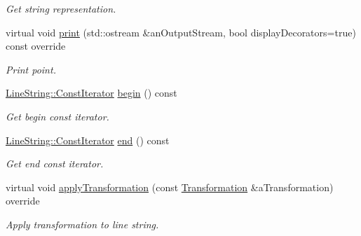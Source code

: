 \begin{DoxyCompactItemize}
\begin{DoxyCompactList}\small\item\em Get string representation. \end{DoxyCompactList}\item 
virtual void \hyperlink{classlibrary_1_1math_1_1geom_1_1d2_1_1objects_1_1_line_string_ae980ac86d1f2d8091151252aef2b6adc}{print} (std\+::ostream \&an\+Output\+Stream, bool display\+Decorators=true) const override
\begin{DoxyCompactList}\small\item\em Print point. \end{DoxyCompactList}\item 
\hyperlink{classlibrary_1_1math_1_1geom_1_1d2_1_1objects_1_1_line_string_a7c7a81b557da8ed855b5f4b88a5fa837}{Line\+String\+::\+Const\+Iterator} \hyperlink{classlibrary_1_1math_1_1geom_1_1d2_1_1objects_1_1_line_string_af2e6ff6ec6714eb64bda3c270c92469d}{begin} () const
\begin{DoxyCompactList}\small\item\em Get begin const iterator. \end{DoxyCompactList}\item 
\hyperlink{classlibrary_1_1math_1_1geom_1_1d2_1_1objects_1_1_line_string_a7c7a81b557da8ed855b5f4b88a5fa837}{Line\+String\+::\+Const\+Iterator} \hyperlink{classlibrary_1_1math_1_1geom_1_1d2_1_1objects_1_1_line_string_af86afe62a24b648504822b3adc6c5ecd}{end} () const
\begin{DoxyCompactList}\small\item\em Get end const iterator. \end{DoxyCompactList}\item 
virtual void \hyperlink{classlibrary_1_1math_1_1geom_1_1d2_1_1objects_1_1_line_string_abd9e77eb0e1d319e8f9af23ccb6dc0b4}{apply\+Transformation} (const \hyperlink{classlibrary_1_1math_1_1geom_1_1d2_1_1_transformation}{Transformation} \&a\+Transformation) override
\begin{DoxyCompactList}\small\item\em Apply transformation to line string. \end{DoxyCompactList}\end{DoxyCompactItemize}
